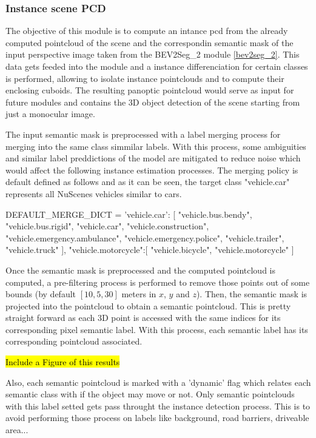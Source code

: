 \subsubsection{Instance scene PCD}
The objective of this module is to compute an intance pcd from the already computed pointcloud of the scene and the correspondin semantic mask of the input perspective image taken from the BEV2Seg\_2 module \ref{bev2seg_2}. This data gets feeded into the module and a instance differenciation for certain classes is performed, allowing to isolate instance pointclouds and to compute their enclosing cuboids. The resulting panoptic pointcloud would serve as input for future modules and contains the 3D object detection of the scene starting from just a monocular image.

The input semantic mask is preprocessed with a label merging process for merging into the same class simmilar labels. With this process, some ambiguities and similar label preddictions of the model are mitigated to reduce noise which would affect the following instance estimation processes. The merging policy is default defined as follows and as it can be seen, the target class "vehicle.car" represents all NuScenes vehicles similar to cars.

DEFAULT_MERGE_DICT = {
    'vehicle.car': [
        "vehicle.bus.bendy", 
        "vehicle.bus.rigid", 
        "vehicle.car", 
        "vehicle.construction", 
        "vehicle.emergency.ambulance", 
        "vehicle.emergency.police", 
        "vehicle.trailer", 
        "vehicle.truck"
    ],
    "vehicle.motorcycle":[
        "vehicle.bicycle",
        "vehicle.motorcycle"
    ]
}

Once the semantic mask is preprocessed and the computed pointcloud is computed, a pre-filtering process is performed to remove those points out of some bounds (by default $\left[10, 5, 30\right]$ meters in $x$, $y$ and $z$). Then, the semantic mask is projected into the pointcloud to obtain a semantic pointcloud. This is pretty straight forward as each 3D point is accessed with the same indices for its corresponding pixel semantic label. With this process, each semantic label has its corresponding pointcloud associated.

\hl{Include a Figure of this results}

Also, each semantic pointcloud is marked with a 'dynamic' flag which relates each semantic class with if the object may move or not. Only semantic pointclouds with this label setted gets pass throught the instance detection process. This is to avoid performing those process on labels like background, road barriers, driveable area...

